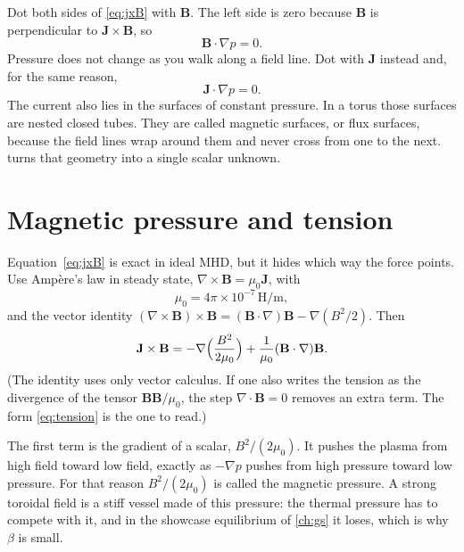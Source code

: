 \documentclass[11pt,a4paper,oneside,openany]{book}
\numberwithin{equation}{chapter}
\newcommand{\grad}{\nabla}
\theoremstyle{definition}
\begin{document}
Dot both sides of \eqref{eq:jxB} with \(\mathbf{B}\). The left side is zero because \(\mathbf{B}\) is perpendicular to \(\mathbf{J}\times\mathbf{B}\), so
\begin{equation}
\label{eq:Bdp}
\mathbf{B}\cdot\grad p=0.
\end{equation}
Pressure does not change as you walk along a field line. Dot with \(\mathbf{J}\) instead and, for the same reason,
\begin{equation}
\label{eq:Jdp}
\mathbf{J}\cdot\grad p=0.
\end{equation}
The current also lies in the surfaces of constant pressure. In a torus those surfaces are nested closed tubes. They are called magnetic surfaces, or flux surfaces, because the field lines wrap around them and never cross from one to the next.  turns that geometry into a single scalar unknown.

\section{Magnetic pressure and tension}

Equation~\eqref{eq:jxB} is exact in ideal MHD, but it hides which way the force points. Use Amp\`ere's law in steady state, \(\grad\times\mathbf{B}=\mu_{0}\mathbf{J}\), with
\begin{equation}
\label{eq:mu0}
\mu_{0}=4\pi\times 10^{-7}\,\mathrm{H/m},
\end{equation}
and the vector identity \((\grad\times\mathbf{B})\times\mathbf{B}=(\mathbf{B}\cdot\grad)\mathbf{B}-\grad(B^{2}/2)\). Then
\begin{equation}
\label{eq:tension}
\mathbf{J}\times\mathbf{B}
=-\grad\Bigl(\frac{B^{2}}{2\mu_{0}}\Bigr)
+\frac{1}{\mu_{0}}(\mathbf{B}\cdot\grad)\mathbf{B}.
\end{equation}
(The identity uses only vector calculus. If one also writes the tension as the divergence of the tensor \(\mathbf{B}\mathbf{B}/\mu_{0}\), the step \(\grad\cdot\mathbf{B}=0\) removes an extra term. The form \eqref{eq:tension} is the one to read.)

The first term is the gradient of a scalar, \(B^{2}/(2\mu_{0})\). It pushes the plasma from high field toward low field, exactly as \(-\grad p\) pushes from high pressure toward low pressure. For that reason \(B^{2}/(2\mu_{0})\) is called the magnetic pressure. A strong toroidal field is a stiff vessel made of this pressure: the thermal pressure has to compete with it, and in the showcase equilibrium of \cref{ch:gs} it loses, which is why \(\beta\) is small.
\end{document}
